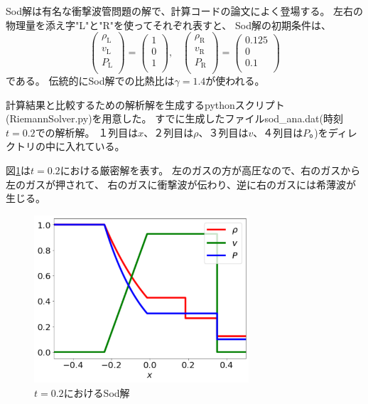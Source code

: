 Sod解は有名な衝撃波管問題の解で、計算コードの論文によく登場する。
左右の物理量を添え字"L"と"R"を使ってそれぞれ表すと、
Sod解の初期条件は、
\begin{equation}
\left(
\begin{array}{c}
\rho_\mathrm{L} \\
v_\mathrm{L} \\
P_\mathrm{L} \\
\end{array}
\right)
= 
\left(
\begin{array}{c}
1 \\
0 \\
1 \\
\end{array}
\right),\;\;\;
\left(
\begin{array}{c}
\rho_\mathrm{R} \\
v_\mathrm{R} \\
P_\mathrm{R} \\
\end{array}
\right)
= 
\left(
\begin{array}{c}
0.125 \\
0 \\
0.1 \\
\end{array}
\right)
\end{equation}
である。
伝統的にSod解での比熱比は$\gamma=1.4$が使われる。

計算結果と比較するための解析解を生成する{\ttfamily python}スクリプト({\ttfamily RiemannSolver.py})を用意した。
すでに生成したファイル{\ttfamily sod\_ana.dat}(時刻$t=0.2$での解析解。
１列目は$x$、２列目は$\rho$、３列目は$v$、４列目は$P$。)をディレクトリの中に入れている。
 
図\ref{fig:sodana}は$t=0.2$における厳密解を表す。
左のガスの方が高圧なので、右のガスから左のガスが押されて、
右のガスに衝撃波が伝わり、逆に右のガスには希薄波が生じる。

\begin{figure}[htpb]
    \centering
    \includegraphics[width=8cm]{figures/sod.pdf}
    \caption{$t=0.2$におけるSod解}
    \label{fig:sodana}
\end{figure}





